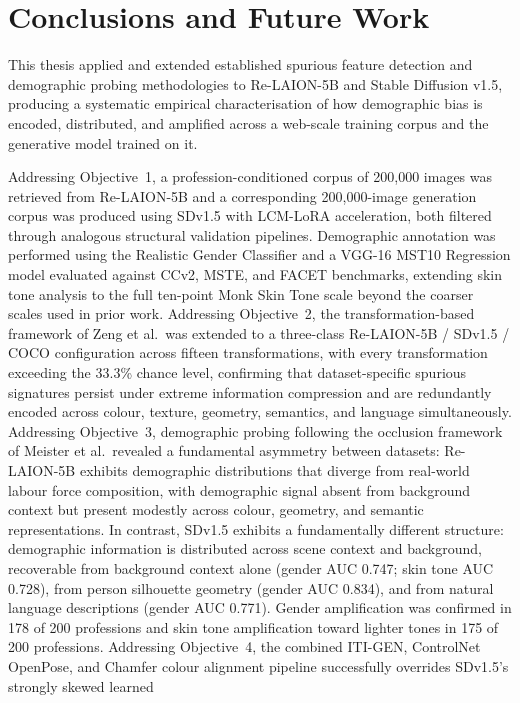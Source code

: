 \chapter{Conclusions and Future Work}

This thesis applied and extended established spurious feature detection and demographic
probing methodologies to Re-LAION-5B and Stable Diffusion v1.5, producing a systematic
empirical characterisation of how demographic bias is encoded, distributed, and amplified
across a web-scale training corpus and the generative model trained on it.

Addressing Objective~1, a profession-conditioned corpus of 200,000 images was retrieved
from Re-LAION-5B and a corresponding 200,000-image generation corpus was produced using
SDv1.5 with LCM-LoRA acceleration, both filtered through analogous structural validation
pipelines. Demographic annotation was performed using the Realistic Gender
Classifier and a VGG-16 MST10 Regression model evaluated against CCv2, MSTE, and FACET
benchmarks, extending skin tone analysis to the full ten-point Monk Skin Tone scale
beyond the coarser scales used in prior work. Addressing Objective~2, the
transformation-based framework of Zeng et al.\ was extended to a three-class
Re-LAION-5B / SDv1.5 / COCO configuration across fifteen transformations, with every
transformation exceeding the 33.3\% chance level, confirming that dataset-specific
spurious signatures persist under extreme information compression and are redundantly
encoded across colour, texture, geometry, semantics, and language simultaneously.
Addressing Objective~3, demographic probing following the occlusion framework of Meister
et al.\ revealed a fundamental asymmetry between datasets: Re-LAION-5B exhibits
demographic distributions that diverge from real-world labour force composition, with
demographic signal absent from background context but present modestly across colour,
geometry, and semantic representations. In contrast, SDv1.5 exhibits a fundamentally
different structure: demographic information is distributed across scene context and
background, recoverable from background context alone (gender AUC 0.747; skin tone AUC
0.728), from person silhouette geometry (gender AUC 0.834), and from natural language
descriptions (gender AUC 0.771). Gender amplification was confirmed in 178 of 200
professions and skin tone amplification toward lighter tones in 175 of 200
professions. Addressing Objective~4, the combined ITI-GEN, ControlNet OpenPose, and
Chamfer colour alignment pipeline successfully overrides SDv1.5's strongly skewed learned
